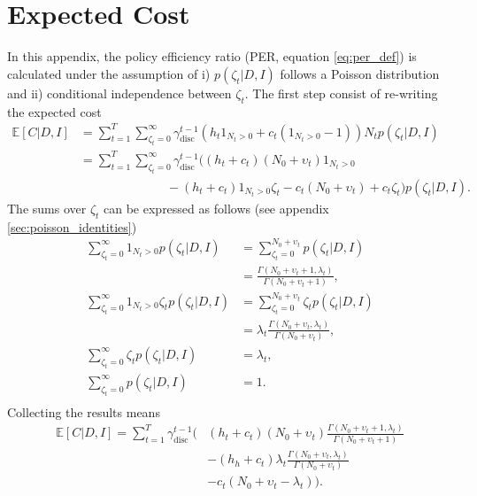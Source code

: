 \section{Expected Cost}
\label{app:expected_cost}
In this appendix, the policy efficiency ratio (PER, equation \eqref{eq:per_def}) is calculated under the assumption of i) $p(\zeta_t|D,I)$ follows a Poisson distribution and ii) conditional independence between $\zeta_t$. The first step consist of re-writing the expected cost
\begin{equation}
	\begin{split}
		\mathbb{E}[C|D,I] &= \sum_{t=1}^{T}\sum_{\zeta_t=0}^\infty \gamma_{\text{disc}}^{t-1} \left( h_t 1_{N_t> 0} + c_t (1_{N_t> 0}-1) \right)N_tp(\zeta_t| D, I)\\
		&= \sum_{t=1}^{T}\sum_{\zeta_t=0}^\infty \gamma_{\text{disc}}^{t-1} \bigg( 
		(h_t+c_t)(N_0 + \upsilon_t)1_{N_t> 0}\\
		&\qquad\qquad\qquad\quad-(h_t+c_t) 1_{N_t> 0}\zeta_t
		- c_t(N_0 + \upsilon_t)+c_t\zeta_t\bigg)p(\zeta_t| D, I).
	\end{split}
\end{equation}
The sums over $\zeta_t$ can be expressed as follows (see appendix \ref{sec:poisson_identities})
\begin{equation}
	\begin{split}
		\sum_{\zeta_t=0}^\infty1_{N_t> 0}p(\zeta_t| D, I) & = \sum_{\zeta_t=0}^{N_0+\upsilon_t} p(\zeta_t| D, I)\\
		&= \frac{\Gamma(N_0+\upsilon_t+1,\lambda_t)}{\Gamma(N_0+\upsilon_t+1)},\\
		\sum_{\zeta_t=0}^\infty1_{N_t> 0}\zeta_tp(\zeta_t| D, I) & = \sum_{\zeta_t=0}^{N_0+\upsilon_t} \zeta_t p(\zeta_t| D, I)\\
		& = \lambda_t \frac{\Gamma(N_0+\upsilon_t,\lambda_t)}{\Gamma(N_0+\upsilon_t)},\\
		\sum_{\zeta_t=0}^\infty\zeta_tp(\zeta_t| D, I) & = \lambda_t,\\
		\sum_{\zeta_t=0}^\infty p(\zeta_t| D, I) & = 1.\\
	\end{split}
	\label{eq:hest2}
\end{equation}
Collecting the results means
\begin{equation}
	\begin{split}
		\mathbb{E}[C|D,I] = \sum_{t=1}^{T} \gamma_{\text{disc}}^{t-1} \bigg(& 
		(h_t+c_t)(N_0 + \upsilon_t)\frac{\Gamma(N_0+\upsilon_t+1,\lambda_t)}{\Gamma(N_0+\upsilon_t+1)}\\&- (h_h+c_t)\lambda_t \frac{\Gamma(N_0+\upsilon_t,\lambda_t)}{\Gamma(N_0+\upsilon_t)}\\
		&- c_t(N_0 + \upsilon_t-\lambda_t)\bigg).
	\end{split}
	\label{eq:exact}
\end{equation}